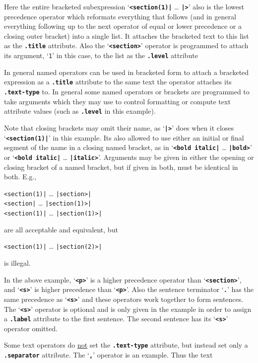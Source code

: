 \documentclass[12pt]{article}
\newcommand{\TT}[1]{{\tt \bfseries #1}}
\begin{document}
Here the entire bracketed subexpression
`\TT{<section(1)|} \ldots{} \TT{|>}'
also is the lowest precedence operator which reformats everything that
follows (and in general everything following up to the next operator of
equal or lower precedence or a closing outer bracket) into a single list.
It attaches the bracketed text to this list as the \TT{.title} attribute.
Also the `\TT{<section>}' operator is programmed to attach its argument,
`\verb|1|' in this case, to the list as the \TT{.level} attribute

In general named operators can be used in bracketed form to attach
a bracketed expression as a \TT{.title} attribute to the same text
the operator attaches its \TT{.text-type} to.  In general some
named operators or brackets are programmed to take arguments which
they may use to control formatting or compute text attribute values
(such as \TT{.level} in this example).

Note that closing brackets may omit their name, as `\TT{|>}' does
when it closes `\TT{<section(1)|}' in this example.  Its also allowed to
use either an initial or final segment of the name in a closing
named bracket, as in `\TT{<bold italic|} \ldots{} \TT{|bold>}'
or `\TT{<bold italic|} \ldots{} \TT{|italic>}'.
Arguments may be given in either the opening or closing bracket of a named
bracket, but if given in both, must be identical in both.  E.g.,
\begin{center}
\verb/<section(1)|/ \ldots{} \verb/|section>|/ \\
\verb/<section|/ \ldots{} \verb/|section(1)>|/ \\
\verb/<section(1)|/ \ldots{} \verb/|section(1)>|/ \\
\end{center}
are all acceptable and equivalent, but
\begin{center}
\verb/<section(1)|/ \ldots{} \verb/|section(2)>|/
\end{center}
is illegal.


In the above example,
`\TT{<p>}' is a higher precedence operator than `\TT{<section>}', and
`\TT{<s>}' is higher precedence than `\TT{<p>}'.  Also the sentence
terminator `\TT{.}' has the same precedence as `\TT{<s>}' and these
operators work together to form sentences.  The `\TT{<s>}' operator
is optional and is only given in the example in order to assign a \TT{.label}
attribute to the first sentence.  The second sentence has its `\TT{<s>}'
operator omitted.

Some text operators do \underline{not} set the \TT{.text-type} attribute,
but instead set only a \TT{.separator} attribute.  The `\TT{,}'
operator is an example.  Thus the text
\end{document}
